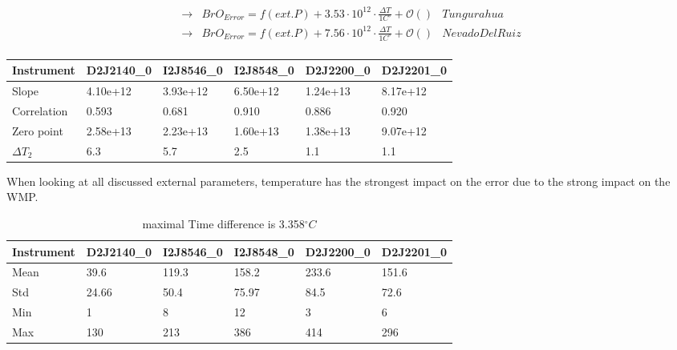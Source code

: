 \documentclass  [
  paper    = a4,
  BCOR     = 10mm,
  twoside,
  fontsize = 12pt,
  fleqn,
  toc      = bibnumbered,
  toc      = listofnumbered,
  numbers  = noendperiod,
  headings = normal,
  listof   = leveldown,
  version  = 3.03
]                                       {scrreprt}
\begin{document}
	\begin{align*}
		\rightarrow&  BrO_{Error} = f(ext. P)+ 3.53\cdot10^{12}\cdot\frac{\Delta T}{1C^{\circ}} + \mathcal{O}\left(\right) & Tungurahua\\
		\rightarrow&  BrO_{Error} = f(ext. P)+7.56\cdot10^{12}\cdot\frac{\Delta T}{1C^{\circ}} + \mathcal{O}\left(\right) & Nevado Del Ruiz\\
	\end{align*}


	\begin{table}[h]
		\begin{tabular}{|p{2cm}|p{2cm}|p{2cm}|p{2cm}|p{2cm}|p{2cm}|}
		Instrument	&D2J2140\_0&I2J8546\_0& I2J8548\_0&D2J2200\_0&D2J2201\_0\\
			\toprule
			Slope&4.10e+12 &3.93e+12 &6.50e+12 &1.24e+13&8.17e+12 \\
			\midrule
			Correlation
			& 
			0.593& 
			0.681& 
			0.910& 
			0.886& 
			0.920\\
			\midrule
			Zero point&2.58e+13&2.23e+13&1.60e+13& 1.38e+13& 9.07e+12\\
			\midrule
			$\Delta T_{2}$&6.3&5.7&2.5&1.1&1.1\\
			\bottomrule
		\end{tabular}
	\end{table}
	When looking at all discussed external parameters, temperature has  the strongest impact on the  error due to the strong impact on the WMP.
	\begin{table}
	\begin{tabular}{|p{2cm}|p{2cm}|p{2cm}|p{2cm}|p{2cm}|p{2cm}|}
		Instrument	&D2J2140\_0&I2J8546\_0& I2J8548\_0&D2J2200\_0&D2J2201\_0\\
		\toprule
		Mean&39.6&119.3&158.2&233.6&151.6\\
		\midrule
		Std&
		24.66&
		50.4&
		75.97&
		84.5&
		72.6\\
		\midrule
		Min&1&8&12&3 &6\\
		\midrule
		Max&130&213&386&414 &296\\
		\bottomrule
	\end{tabular}
	\caption{maximal Time difference is 3.358$^{\circ}C$}
	\end{table}	
\end{document}

